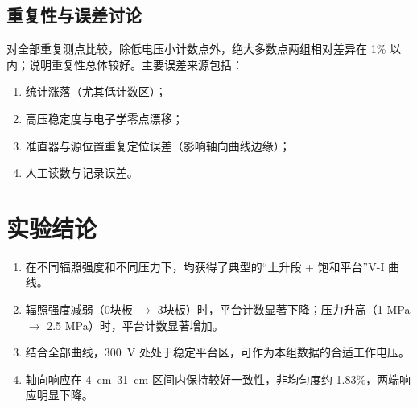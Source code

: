 \documentclass[12pt,a4paper]{article}
\begin{document}
\subsection{重复性与误差讨论}
对全部重复测点比较，除低电压小计数点外，绝大多数点两组相对差异在 1\% 以内；说明重复性总体较好。主要误差来源包括：
\begin{enumerate}
    \item 统计涨落（尤其低计数区）；
    \item 高压稳定度与电子学零点漂移；
    \item 准直器与源位置重复定位误差（影响轴向曲线边缘）；
    \item 人工读数与记录误差。
\end{enumerate}

\section{实验结论}
\begin{enumerate}
    \item 在不同辐照强度和不同压力下，均获得了典型的“上升段 + 饱和平台”V-I 曲线。
    \item 辐照强度减弱（0块板 $\to$ 3块板）时，平台计数显著下降；压力升高（1 MPa $\to$ 2.5 MPa）时，平台计数显著增加。
    \item 结合全部曲线，\SI{300}{\volt} 处处于稳定平台区，可作为本组数据的合适工作电压。
    \item 轴向响应在 \SIrange{4}{31}{cm} 区间内保持较好一致性，非均匀度约 1.83\%，两端响应明显下降。
\end{enumerate}
\end{document}
